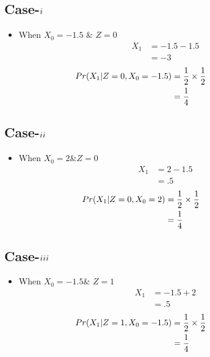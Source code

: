 \documentclass[11pt,a4paper,twocolumn]{article}
\begin{document}
        \subsection{Case-$\romannumeral1$} 
    \begin{itemize}
        \item When $X_{0}=-1.5$ \& $Z=0$
        \begin{align*}
         X_{1}&=-1.5-1.5\\
         &=-3
        \end{align*}
        \begin{align*}
        \hspace{-2cm}
          Pr(X_{1}|Z=0,X_{0}=-1.5)&=\frac{1}{2}\times\frac{1}{2}\\
        &=\frac{1}{4}
        \end{align*}
    \end{itemize}
        
      \subsection{Case-$\romannumeral2$}
      \begin{itemize}
          \item When $X_{0}=2 \& Z=0$
           \begin{align*}
         X_{1}&=2-1.5\\
         &=.5
         \end{align*}
          \begin{align*}
        \hspace{-2cm}
          Pr(X_{1}|Z=0,X_{0}=2)&=\frac{1}{2}\times\frac{1}{2}\\
        &=\frac{1}{4}
        \end{align*}
      \end{itemize}
       \subsection{Case-$\romannumeral3$}
       \begin{itemize}
           \item When $X_{0}=-1.5$\& $Z=1$
           \begin{align*}
         X_{1}&=-1.5+2\\
         &=.5
         \end{align*}
         \begin{align*}
        \hspace{-2cm}
          Pr(X_{1}|Z=1,X_{0}=-1.5)&=\frac{1}{2}\times\frac{1}{2}\\
        &=\frac{1}{4}
        \end{align*}
       \end{itemize}
\end{document}
